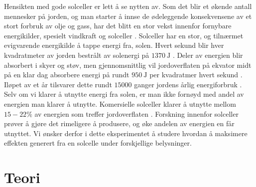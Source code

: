 \documentclass[%
 reprint,
 amsmath,amssymb,
 aps,
 norsk,
 booktabs
]{revtex4-1}
\begin{document}
Hensikten med gode solceller er lett å se nytten av. Som det blir et økende antall mennesker på jorden, og man starter å innse de ødeleggende konsekvensene av et stort forbruk av olje og gass, har det blitt en stor vekst innenfor fornybare energikilder, spesielt vindkraft og solceller \cite{oppgave}. Solceller har en stor, og tilnærmet evigvarende energikilde å tappe energi fra, solen. Hvert sekund blir hver kvadratmeter av jorden bestrålt av solenergi på $\SI{1370}{\joule}$ \cite{snl2}. Deler av energien blir absorbert i skyer og støv, men gjennomsnittlig vil jordoverflaten på ekvator midt på en klar dag absorbere energi på rundt $\SI{950}{\joule}$ per kvadratmer hvert sekund \cite{oppgave}. Iløpet av et år tilsvarer dette rundt $15 000$ ganger jordens årlig energiforbruk \cite{snl2}. Selv om vi klarer å utnytte energi fra solen, er man ikke fornøyd med andel av energien man klarer å utnytte. Komersielle solceller klarer å utnytte mellom $15-22\%$ av energien som treffer jordoverflaten \cite{oppgave}. Forskning innenfor solceller prøver å gjøre det rimeligere å produsere, og øke andelen av energien en får utnyttet. Vi ønsker derfor i dette eksperimentet å studere hvordan å maksimere effekten generert fra en solcelle under forskjellige belysninger.
\section{Teori}
\end{document}
